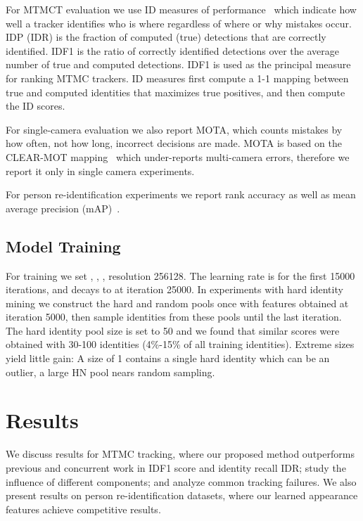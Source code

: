 \documentclass[10pt,twocolumn,letterpaper]{article}
\begin{document}
For MTMCT evaluation we use ID measures of performance~\cite{ristani2016performance} which indicate how well a tracker identifies who is where regardless of  where or why mistakes occur. IDP (IDR) is the fraction of computed (true) detections that are correctly identified. IDF1 is the ratio of correctly identified detections over the average number of true and computed detections. IDF1 is used as the principal measure for ranking MTMC trackers. ID measures first compute a 1-1 mapping between true and computed identities that maximizes true positives, and then compute the ID scores.

For single-camera evaluation we also report MOTA, which counts mistakes by how often, not how long, incorrect decisions are made. MOTA is based on the CLEAR-MOT mapping~\cite{bernardin08} which under-reports multi-camera errors, therefore we report it only in single camera experiments.

For person re-identification experiments we report rank accuracy as well as mean average precision (mAP)~\cite{zheng2015scalable}.

\subsection{Model Training}

For training we set , , , resolution 256128. The learning rate is  for the first 15000 iterations, and decays to  at iteration 25000. In experiments with hard identity mining we construct the hard and random pools once with features obtained at iteration 5000, then sample identities from these pools until the last iteration. The hard identity pool size  is set to 50 and we found that similar scores were obtained with 30-100 identities (4\%-15\% of all training identities). Extreme sizes yield little gain: A size of 1 contains a single hard identity which can be an outlier, a large HN pool nears random sampling.

\section{Results}

We discuss results for MTMC tracking, where our proposed method outperforms previous and concurrent work in IDF1 score and identity recall IDR; study the influence of different components; and analyze common tracking failures. We also present results on person re-identification datasets, where our learned appearance features achieve competitive results.
\end{document}
